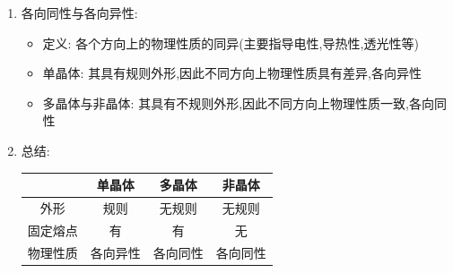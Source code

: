 \documentclass{article}
\begin{document}
\begin{enumerate}
    \item 各向同性与各向异性:
          \begin{itemize}
              \item 定义: 各个方向上的物理性质的同异(主要指导电性,导热性,透光性等)
              \item 单晶体: 其具有规则外形,因此不同方向上物理性质具有差异,各向异性
              \item 多晶体与非晶体: 其具有不规则外形,因此不同方向上物理性质一致,各向同性
          \end{itemize}

    \item 总结:

          \hspace{3em}\begin{tabular}{|c|c|c|c|}
              \hline
                   & 单晶体  & 多晶体  & 非晶体  \\
              \hline
              外形   & 规则   & 无规则  & 无规则  \\
              \hline
              固定熔点 & 有    & 有    & 无    \\
              \hline
              物理性质 & 各向异性 & 各向同性 & 各向同性 \\
              \hline
          \end{tabular}
\end{enumerate}

\vspace{2em}
\end{document}
